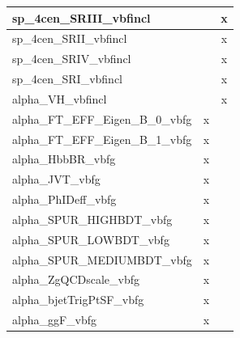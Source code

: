 \begin{table}[htbp]
\begin{tabular}{|l|c|c|}
sp\_4cen\_SRIII\_vbfincl                                               &      & x       \\ \hline
sp\_4cen\_SRII\_vbfincl                                                &      & x       \\ \hline
sp\_4cen\_SRIV\_vbfincl                                                &      & x       \\ \hline
sp\_4cen\_SRI\_vbfincl                                                 &      & x       \\ \hline
alpha\_VH\_vbfincl                                                     &      & x       \\ \hline
alpha\_FT\_EFF\_Eigen\_B\_0\_vbfg                                      & x    &         \\ \hline
alpha\_FT\_EFF\_Eigen\_B\_1\_vbfg                                      & x    &         \\ \hline
alpha\_HbbBR\_vbfg                                                     & x    &         \\ \hline
alpha\_JVT\_vbfg                                                       & x    &         \\ \hline
alpha\_PhIDeff\_vbfg                                                   & x    &         \\ \hline
alpha\_SPUR\_HIGHBDT\_vbfg                                             & x    &         \\ \hline
alpha\_SPUR\_LOWBDT\_vbfg                                              & x    &         \\ \hline
alpha\_SPUR\_MEDIUMBDT\_vbfg                                           & x    &         \\ \hline
alpha\_ZgQCDscale\_vbfg                                                & x    &         \\ \hline
alpha\_bjetTrigPtSF\_vbfg                                              & x    &         \\ \hline
alpha\_ggF\_vbfg                                                       & x    &         \\ \hline
\end{tabular}
\end{table}


